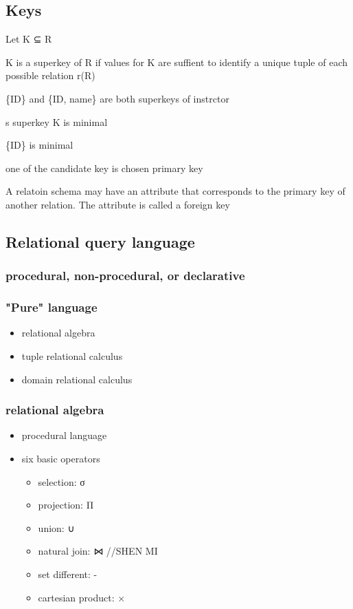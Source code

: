 \documentclass[11pt]{article}
\begin{document}
\subsection{Keys}
\label{sec-2-3}
Let K ⊆ R
\begin{description}
\item[{superkey}] K is a superkey of R if values for K are suffient to
identify a unique tuple of each possible relation r(R)
\item \{ID\} and \{ID, name\} are both superkeys of instrctor
\item[{candidate key}] s superkey K is minimal
\item \{ID\} is minimal
\item[{primary key}] one of the candidate key is chosen primary key
\item[{foreign key}] A relatoin schema may have an attribute that
corresponds to the primary key of another relation.
The attribute is called a foreign key
\end{description}
\subsection{Relational query language}
\label{sec-2-4}
\subsubsection{procedural, non-procedural, or declarative}
\label{sec-2-4-1}
\subsubsection{"Pure" language}
\label{sec-2-4-2}
\begin{itemize}
\item relational algebra
\item tuple relational calculus
\item domain relational calculus
\end{itemize}
\subsubsection{relational algebra}
\label{sec-2-4-3}
\begin{itemize}
\item procedural language
\item six basic operators
\begin{itemize}
\item selection: σ
\item projection: Π
\item union: ∪
\item natural join: ⋈ //SHEN MI
\item set different: -
\item cartesian product: ×
\end{itemize}
\end{itemize}
\end{document}

